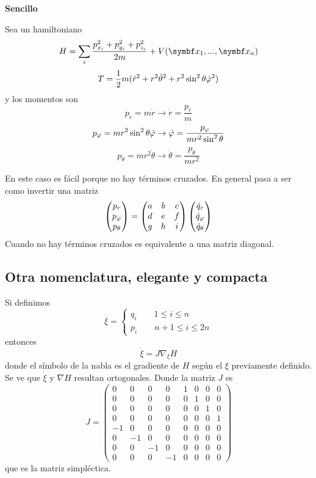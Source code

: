 \documentclass[10pt,oneside]{CBFT_book}
\begin{document}
\begin{ejemplo}{\bf Sencillo}

Sea un hamiltoniano
\[
	H = \sum_i \frac{ p_{x_i}^2 + p_{y_i}^2 + p_{z_i}^2 }{2m} + V( \vb{x}_1,...,\vb{x}_n )
\]
\[
	T = \frac 1 2 m ( \dot{r}^2 + r^2 \dot{\theta}^2 + r^2 \sin^2 \theta \dot{\varphi}^2 )
\]
y los momentos son
\[
	p_r = m \dot{r} \to \dot{r} = \frac{p_r}{m}
\]
\[
	p_\varphi = m r^2 \sin^2 \theta \dot{\varphi} \to \dot{\varphi} = \frac{p_\varphi}{m r^2 \sin^2 \theta}
\]
\[
	p_\theta = m r^2 \dot{\theta} \to \dot{\theta} = \frac{p_\theta}{m r^2}
\]

En este caso es fácil porque no hay términos cruzados. En general pasa a ser como invertir una matriz
\[
	\begin{pmatrix}
	p_r \\
	p_\varphi \\
	p_\theta
	\end{pmatrix} =
	\begin{pmatrix}
	 a & b & c \\
	 d & e & f \\
	 g & h & i 
	\end{pmatrix}
	\begin{pmatrix}
	\dot{q}_r \\
	\dot{q}_\varphi \\
	\dot{q}_\theta
	\end{pmatrix}
\]
Cuando no hay términos cruzados es equivalente a una matriz diagonal.
\end{ejemplo}

\subsection{Otra nomenclatura, elegante y compacta}

Si definimos
\[
	\xi = \begin{cases}
		q_i \qquad 1 \leq i \leq n \\
		p_i \qquad n + 1 \leq i \leq 2n
	      \end{cases}
\]
entonces
\[
	\dot{\xi} = J \nabla_\xi H
\]
donde el símbolo de la nabla es el gradiente de $H$ según el $\xi$ previamente definido.
Se ve que $\dot{\xi}$ y $\nabla H$ resultan ortogonales.
Donde la matriz $J$ es
\[
	J = \begin{pmatrix}
	0 & 0 & 0 & 0 & 1 & 0 & 0 & 0 \\
	0 & 0 & 0 & 0 & 0 & 1 & 0 & 0 \\	
	0 & 0 & 0 & 0 & 0 & 0 & 1 & 0 \\	
	0 & 0 & 0 & 0 & 0 & 0 & 0 & 1 \\
	-1 & 0 & 0 & 0 & 0 & 0 & 0 & 0 \\	
	0 & -1 & 0 & 0 & 0 & 0 & 0 & 0 \\
	0 & 0 & -1 & 0 & 0 & 0 & 0 & 0 \\
	0 & 0 & 0 & -1 & 0 & 0 & 0 & 0 
	\end{pmatrix}
\]
que es la matriz simpléctica.
\end{document}
